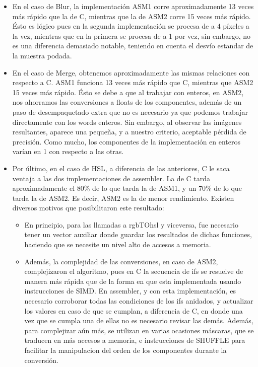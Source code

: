 \begin{itemize}

\item { En el caso de Blur, la implementación ASM1 corre aproximadamente 13 veces más rápido que la de C, mientras que la de ASM2 corre 15 veces más rápido. Ésto es lógico pues en la segunda implementación se procesa de a 4 píxeles a la vez, mientras que en la primera se procesa de a 1 por vez, sin embargo, no es una diferencia demasiado notable, teniendo en cuenta el desvío estandar de la muestra podada. }
\item { En el caso de Merge, obtenemos aproximadamente las mismas relaciones con respecto a C. ASM1 funciona 13 veces más rápido que C, mientras que ASM2 15 veces más rápido. Ésto se debe a que al trabajar con enteros, en ASM2, nos ahorramos las conversiones a floats de los componentes, además de un paso de desempaquetado extra que no es necesario ya que podemos trabajar directamente con los words enteros. Sin embargo, al observar las imágenes resultantes, aparece una pequeña, y a nuestro criterio, aceptable pérdida de precisión. Como mucho, los componentes de la implementación en enteros varían en 1 con respecto a las otras.}
\item { Por último, en el caso de HSL, a diferencia de las anteriores, C le saca ventaja a las dos implementaciones de assembler. La de C tarda aproximadamente el 80\% de lo que tarda la de ASM1, y un 70\% de lo que tarda la de ASM2. Es decir, ASM2 es la de menor rendimiento. Existen diversos motivos que posibilitaron este resultado:
	\begin{itemize}
	\item {En principio, para las llamadas a rgbTOhsl y viceversa, fue necesario tener un vector auxiliar donde guardar los resultados de dichas funciones, haciendo que se necesite un nivel alto de accesos a memoria.}
	\item {Además, la complejidad de las conversiones, en caso de ASM2, complejizaron el algoritmo, pues en C la secuencia de ifs se resuelve de manera más rápida que de la forma en que esta implementada usando instrucciones de SIMD. En assembler, y con esta implementación, es necesario corroborar todas las condiciones de los ifs anidados, y actualizar los valores en caso de que se cumplan, a diferencia de C, en donde una vez que se cumpla una de ellas no es necesario revisar las demás. Además, para complejizar aún más, se utilizan en varias ocasiones máscaras, que se traducen en más accesos a memoria, e instrucciones de SHUFFLE para facilitar la manipulacion del orden de los componentes durante la conversión. }

\end{itemize}}
\end{itemize}
